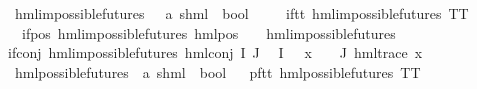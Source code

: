 \begin{isabellebody}
\isanewline
{}\isamarkupfalse%
\ hml{\isacharunderscore}{\kern0pt}impossible{\isacharunderscore}{\kern0pt}futures\ {\isacharcolon}{\kern0pt}{\isacharcolon}{\kern0pt}\ \ {\isachardoublequoteopen}{\isacharparenleft}{\kern0pt}{\isacharprime}{\kern0pt}a{\isacharcomma}{\kern0pt}\ {\isacharprime}{\kern0pt}s{\isacharparenright}{\kern0pt}hml\ {\isasymRightarrow}\ bool{\isachardoublequoteclose}\isanewline
\ \ \isanewline
\ \ if{\isacharunderscore}{\kern0pt}tt{\isacharcolon}{\kern0pt}\ {\isachardoublequoteopen}hml{\isacharunderscore}{\kern0pt}impossible{\isacharunderscore}{\kern0pt}futures\ TT{\isachardoublequoteclose}\ {\isacharbar}{\kern0pt}\isanewline
\ \ if{\isacharunderscore}{\kern0pt}pos{\isacharcolon}{\kern0pt}\ {\isachardoublequoteopen}hml{\isacharunderscore}{\kern0pt}impossible{\isacharunderscore}{\kern0pt}futures\ {\isacharparenleft}{\kern0pt}hml{\isacharunderscore}{\kern0pt}pos\ {\isasymalpha}\ {\isasymphi}{\isacharparenright}{\kern0pt}{\isachardoublequoteclose}\ \ {\isachardoublequoteopen}hml{\isacharunderscore}{\kern0pt}impossible{\isacharunderscore}{\kern0pt}futures\ {\isasymphi}{\isachardoublequoteclose}\ {\isacharbar}{\kern0pt}\isanewline
if{\isacharunderscore}{\kern0pt}conj{\isacharcolon}{\kern0pt}\ {\isachardoublequoteopen}hml{\isacharunderscore}{\kern0pt}impossible{\isacharunderscore}{\kern0pt}futures\ {\isacharparenleft}{\kern0pt}hml{\isacharunderscore}{\kern0pt}conj\ I\ J\ {\isasymPhi}{\isacharparenright}{\kern0pt}{\isachardoublequoteclose}\isanewline
{}\ {\isachardoublequoteopen}I\ {\isacharequal}{\kern0pt}\ {\isacharbraceleft}{\kern0pt}{\isacharbraceright}{\kern0pt}{\isachardoublequoteclose}\ {\isachardoublequoteopen}{\isasymforall}x\ {\isasymin}\ {\isacharparenleft}{\kern0pt}{\isasymPhi}\ {\isacharbackquote}{\kern0pt}\ J{\isacharparenright}{\kern0pt}{\isachardot}{\kern0pt}\ {\isacharparenleft}{\kern0pt}hml{\isacharunderscore}{\kern0pt}trace\ x{\isacharparenright}{\kern0pt}{\isachardoublequoteclose}\isanewline
\isanewline
{}\isamarkupfalse%
\ hml{\isacharunderscore}{\kern0pt}possible{\isacharunderscore}{\kern0pt}futures\ {\isacharcolon}{\kern0pt}{\isacharcolon}{\kern0pt}\ {\isachardoublequoteopen}{\isacharparenleft}{\kern0pt}{\isacharprime}{\kern0pt}a{\isacharcomma}{\kern0pt}\ {\isacharprime}{\kern0pt}s{\isacharparenright}{\kern0pt}hml\ {\isasymRightarrow}\ bool{\isachardoublequoteclose}\isanewline
\ \ \isanewline
pf{\isacharunderscore}{\kern0pt}tt{\isacharcolon}{\kern0pt}\ {\isachardoublequoteopen}hml{\isacharunderscore}{\kern0pt}possible{\isacharunderscore}{\kern0pt}futures\ TT{\isachardoublequoteclose}\ {\isacharbar}{\kern0pt}\isanewline

\end{isabellebody}
